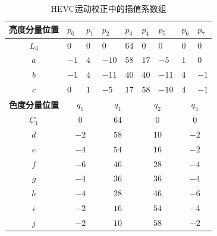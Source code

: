 \begin{table}[!tp]
	\begin{center}
		\caption{HEVC运动校正中的插值系数组} \label{table:coeff_position}
		\renewcommand{\arraystretch}{1.3}
		\begin{tabular}{c|p{1cm}|p{1cm}|p{1cm}|p{1cm}|p{1cm}|p{1cm}|p{1cm}|p{1cm}}
			\hline
			\textbf{亮度分量位置} & \textbf{$p_0$} & \textbf{$p_1$} & \textbf{$p_2$} & \textbf{$p_3$} & \textbf{$p_4$} & \textbf{$p_5$} & \textbf{$p_6$} & \textbf{$p_7$} \\
			\hline
			\hline
			$L_3$ & $0$ & $0$ & $0$ & $64$ & $0$ & $0$ & $0$ & $0$ \\
			\hline
			$a$ & $-1$ & $4$ & $-10$ & $58$ & $17$ & $-5$ & $1$ & $0$ \\
			\hline
			$b$ & $-1$ & $4$ & $-11$ & $40$ & $40$ & $-11$ & $4$ & $-1$ \\
			\hline
			$c$ & $0$ & $1$ & $-5$ & $17$ & $58$ & $-10$ & $4$ & $-1$ \\
			\hline
			\hline
			\textbf{色度分量位置} & \multicolumn{2}{|c|}{\textbf{$q_0$}} & \multicolumn{2}{c}{\textbf{$q_1$}} & \multicolumn{2}{|c|}{\textbf{$q_2$}} & \multicolumn{2}{c}{\textbf{$q_3$}} \\
			\hline
			\hline
			$C_1$ & \multicolumn{2}{|c|}{\textbf{$0$}} & \multicolumn{2}{c}{\textbf{$64$}} & \multicolumn{2}{|c|}{\textbf{$0$}} & \multicolumn{2}{c}{\textbf{$0$}} \\
			\hline
			$d$ & \multicolumn{2}{|c|}{\textbf{$-2$}} & \multicolumn{2}{c}{\textbf{$58$}} & \multicolumn{2}{|c|}{\textbf{$10$}} & \multicolumn{2}{c}{\textbf{$-2$}} \\
			\hline
			$e$ & \multicolumn{2}{|c|}{\textbf{$-4$}} & \multicolumn{2}{c}{\textbf{$54$}} & \multicolumn{2}{|c|}{\textbf{$16$}} & \multicolumn{2}{c}{\textbf{$-2$}} \\
			\hline
			$f$ & \multicolumn{2}{|c|}{\textbf{$-6$}} & \multicolumn{2}{c}{\textbf{$46$}} & \multicolumn{2}{|c|}{\textbf{$28$}} & \multicolumn{2}{c}{\textbf{$-4$}} \\
			\hline
			$g$ & \multicolumn{2}{|c|}{\textbf{$-4$}} & \multicolumn{2}{c}{\textbf{$36$}} & \multicolumn{2}{|c|}{\textbf{$36$}} & \multicolumn{2}{c}{\textbf{$-4$}} \\
			\hline
			$h$ & \multicolumn{2}{|c|}{\textbf{$-4$}} & \multicolumn{2}{c}{\textbf{$28$}} & \multicolumn{2}{|c|}{\textbf{$46$}} & \multicolumn{2}{c}{\textbf{$-6$}} \\
			\hline
			$i$ & \multicolumn{2}{|c|}{\textbf{$-2$}} & \multicolumn{2}{c}{\textbf{$16$}} & \multicolumn{2}{|c|}{\textbf{$54$}} & \multicolumn{2}{c}{\textbf{$-4$}} \\
			\hline
			$j$ & \multicolumn{2}{|c|}{\textbf{$-2$}} & \multicolumn{2}{c}{\textbf{$10$}} & \multicolumn{2}{|c|}{\textbf{$58$}} & \multicolumn{2}{c}{\textbf{$-2$}} \\
			\hline
		\end{tabular}
	\end{center}
\end{table}

